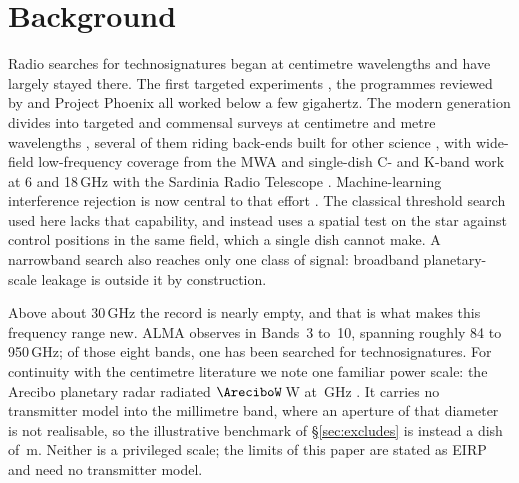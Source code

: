 \section{Background}
\label{sec:background}

Radio searches for technosignatures began at centimetre wavelengths and
have largely stayed there. The first targeted experiments
\citep{CocconiMorrison1959,Drake1960}, the programmes reviewed by
\citet{Tarter2001} and Project Phoenix \citep{Backus2002} all worked
below a few gigahertz. The modern generation divides into targeted and
commensal surveys at centimetre and metre wavelengths
\citep{Zhang2020,Czech2021,FAST3IATLAS2025,LOFARdualsite2023,Choza2024},
several of them riding back-ends built for other science
\citep{Morrison2023}, with wide-field low-frequency coverage from the MWA
\citep{Tremblay2024}
and single-dish C- and K-band work at 6 and 18\,GHz with the Sardinia
Radio Telescope \citep{SRT2025}. Machine-learning interference rejection
is now central to that effort
\citep{Ma2023,GLOBULAR2025,AnomalyParkesGBT2025}. The
classical threshold search used here lacks that capability, and instead
uses a spatial test on the star against control positions in the same
field, which a single dish cannot make. A narrowband search also reaches
only one class of signal: broadband planetary-scale leakage
\citep{BRaTs2026} is outside it by construction.

Above about 30\,GHz the record is nearly empty, and that is what makes
this frequency range new. ALMA observes in Bands~3 to~10, spanning
roughly 84 to 950\,GHz; of those eight bands, one has been searched for
technosignatures. For continuity with the centimetre literature we note
one familiar power scale: the Arecibo planetary radar radiated
$\AreciboW$\,W at \ArecGHz\,GHz
\citep{EarthDetectingEarth2025}. It carries no transmitter
model into the millimetre band, where an aperture of that diameter is not
realisable, so the illustrative benchmark of \S\ref{sec:excludes} is
instead a dish of \BenchDiam\,m. Neither is a privileged scale; the limits
of this paper are stated as EIRP and need no transmitter model.

